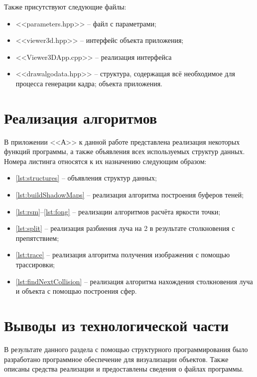 {        Также присутствуют следующие файлы:
        \begin{itemize}
            \item <<parameters.hpp>> -- файл с параметрами;
            \item <<viewer3d.hpp>> -- интерфейс объекта приложения;
            \item <<Viewer3DApp.cpp>> -- реализация интерфейса
            \item <<drawalgodata.hpp>> -- структура, содержащая всё
            необходимое для процесса генерации кадра;
            объекта приложения.
        \end{itemize}
    }

\section{Реализация алгоритмов} {
    В приложении <<А>> к данной работе представлена реализация некоторых функций программы,
    а также объявления всех используемых структур данных.
    Номера листинга относятся к их назначению следующим образом:
    \begin{itemize}
        \item \ref{lst:structures} -- объявления структур данных;
        \item
            \ref{lst:buildShadowMaps} --
            реализация алгоритма построения буферов теней;
        \item
            \ref{lst:rsm}--\ref{lst:fong} --
            реализации алгоритмов расчёта яркости точки;
        \item
            \ref{lst:split} -- реализация разбиения луча на 2
            в результате столкновения с препятствием;
        \item
            \ref{lst:trace} -- реализация алгоритма получения
            изображения с помощью трассировки;
        \item
            \ref{lst:findNextCollision} -- реализация алгоритма нахождения
            столкновения луча и объекта с помощью построения сфер.
    \end{itemize}
}

\section*{Выводы из технологической части}
В результате данного раздела с помощью структурного программирования
было разработано программное обеспечение для визуализации объектов.
Также описаны средства реализации и предоставлены сведения о файлах
программы.